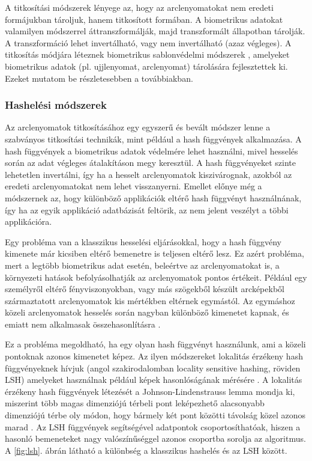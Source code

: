 A titkosítási módszerek lényege az, hogy az arclenyomatokat nem eredeti formájukban tároljuk, hanem titkosított formában. A biometrikus adatokat valamilyen módszerrel áttranszformálják, majd transzformált állapotban tárolják. A transzformáció lehet invertálható, vagy nem invertálható (azaz végleges). A titkosítás módjára léteznek biometrikus sablonvédelmi módszerek \cite{patel2015cancelable}, amelyeket biometrikus adatok (pl. ujjlenyomat, arclenyomat) tárolására fejlesztettek ki. Ezeket mutatom be részletesebben a továbbiakban.



\subsubsection{Hashelési módszerek}

Az arclenyomatok titkosításához egy egyszerű és bevált módszer lenne a szabványos titkosítási technikák, mint például a hash függvények alkalmazása. A hash függvények a biometrikus adatok védelmére lehet használni, mivel hesselés során az adat végleges átalakításon megy keresztül. A hash függvényeket szinte lehetetlen invertálni, így ha a hesselt arclenyomatok kiszivárognak, azokból az eredeti arclenyomatokat nem lehet visszanyerni. Emellet előnye még a módszernek az, hogy különböző applikációk eltérő hash függvényt használnának, így ha az egyik applikáció adatbázisát feltörik, az nem jelent veszélyt a többi applikációra.

Egy probléma van a klasszikus hesselési eljárásokkal, hogy a hash függvény kimenete már kicsiben eltérő bemenetre is teljesen eltérő lesz. Ez azért probléma, mert a legtöbb biometrikus adat esetén, beleértve az arclenyomatokat is, a környezeti hatások befolyásolhatják az arclenyomatok pontos értékeit. Például egy személyről eltérő fényviszonyokban, vagy más szögekből készült arcképekből származtatott arclenyomatok kis mértékben eltérnek egymástól. Az egymáshoz közeli arclenyomatok hesselés során nagyban különböző kimenetet kapnak, és emiatt nem alkalmasak összehasonlításra \cite{patel2015cancelable}. 

Ez a probléma megoldható, ha egy olyan hash függvényt használunk, ami a közeli pontoknak azonos kimenetet képez. Az ilyen módszereket lokalitás érzékeny hash függvényeknek hívjuk (angol szakirodalomban locality sensitive hashing, röviden LSH) amelyeket használnak például képek hasonlóságának mérésére \cite{jing2008visualrank}. A lokalitás érzékeny hash függvények létezését a Johnson-Lindenstrauss lemma mondja ki, miszerint több magas dimenziójú térbeli pont leképezhető alacsonyabb dimenziójú térbe oly módon, hogy bármely két pont közötti távolság közel azonos marad  \cite{johnson1984extensions}. Az LSH függvények segítségével adatpontok csoportosíthatóak, hiszen a hasonló bemeneteket nagy valószínűséggel azonos csoportba sorolja az algoritmus. A \ref{fig:lsh}. ábrán látható a különbség a klasszikus hashelés és az LSH között.

